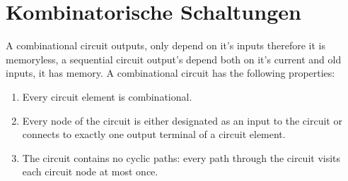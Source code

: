 \section{Kombinatorische Schaltungen}
A combinational circuit outputs, only depend on it's inputs therefore it is memoryless, a sequential circuit output's depend both on it's current and old inputs, it has memory. A combinational circuit has the following properties:
\begin{enumerate}
	\item Every circuit element is combinational.
	\item Every node of the circuit is either designated as an input to the circuit or connects to exactly one output terminal of a circuit element.
	\item The circuit contains no cyclic paths: every path through the circuit visits each circuit node at most once.
\end{enumerate}
	
